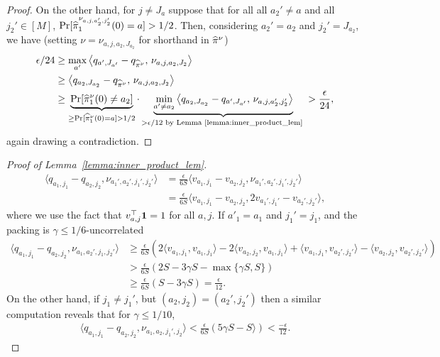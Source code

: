 \begin{proof}
On the other hand, for $j \ne J_{a}$ suppose that for all all $a_2' \ne a$ and all $j_2' \in [M]$,  $\Pr[\widehat{\pi}_1^{\nu_{a,j,a_2',j_2'}}(0) = a] > 1/2$. Then, considering $a_2' = a_2$ and $j_2' = J_{a_2}$, we have  (setting $\nu = \nu_{a,j,a_2,J_{a_2}}$ for shorthand in $\widehat{\pi}^{\nu}$)
\begin{align*}
\epsilon/24 &\ge  \max_{a'}\left\langle q_{a',J_{a'}} - q_{\widehat{\pi}^{\nu}} , \,\nu_{a,j,a_2,J_2}\right\rangle\\
&\ge  \left\langle q_{a_2,J_{a_2}} - q_{\widehat{\pi}^{\nu}} , \,\nu_{a,j,a_2,J_2}\right\rangle\\
&\ge  \underbrace{\Pr[\widehat{\pi}^{\nu}_1(0) \ne a_2]}_{\ge \Pr[\widehat{\pi}^{\nu}_1(0) = a] > 1/2} \cdot\underbrace{\min_{a' \ne a_2}\left\langle q_{a_2,J_{a_2}} - q_{a',J_{a'}} , \,\nu_{a,j,a_2',j_2'}\right\rangle}_{> \epsilon/12 \text{ by Lemma~\ref{lemma:inner_product_lem} }} > \frac{\epsilon}{24},
\end{align*}
again drawing a contradiction.
\end{proof}
\begin{proof}[Proof of Lemma~\ref{lemma:inner_product_lem}]
\begin{align*}
\langle q_{a_1,j_1} - q_{a_2,j_2}, \nu_{a_1',a_2',j_1',j_2'} \rangle &= \frac{\epsilon}{6S} \langle v_{a_1,j_1} - v_{a_2,j_2}, \nu_{a_1',a_2',j_1',j_2'}\rangle\\
&= \frac{\epsilon}{6S} \langle v_{a_1,j_1} - v_{a_2,j_2}, 2v_{a_1',j_1'} - v_{a_2',j_2'} \rangle,
\end{align*}
where we use the fact that $v_{a,j}^\top \mathbf{1} = 1$ for all $a,j$. If $a'_1 = a_1$ and $j_1' = j_1$, and the packing is $\gamma \le 1/6$-uncorrelated
\begin{align*}
\langle q_{a_1,j_1} - q_{a_2,j_2}, \nu_{a_1,a_2',j_1,j_2'} \rangle  &\ge \frac{\epsilon}{6S}\left( 2\langle v_{a_1,j_1},v_{a_1,j_1}\rangle  - 2\langle v_{a_2,j_2},v_{a_1,j_1}\rangle + \langle v_{a_1,j_1}, v_{a_2',j_2'} \rangle -  \langle v_{a_2,j_2}, v_{a_2',j_2'} \rangle\right)\\
&> \frac{\epsilon}{6S}\left( 2S - 3\gamma S - \max\{\gamma S, S\}\right)\\
&\ge \frac{\epsilon}{6S}\left( S - 3\gamma S \right) = \frac{\epsilon}{12}.
\end{align*}
On the other hand, if $j_1 \ne j_1'$, but $(a_2,j_2) = (a_2',j_2')$ then a similar computation reveals that for $\gamma \le 1/10$, 
\begin{align*}
\langle q_{a_1,j_1} - q_{a_2,j_2}, \nu_{a_1,a_2,j_1',j_2} \rangle < \frac{\epsilon}{6S}\left( 5\gamma S  - S\rangle\right) < \frac{-\epsilon}{12}. 
\end{align*}
\end{proof}


